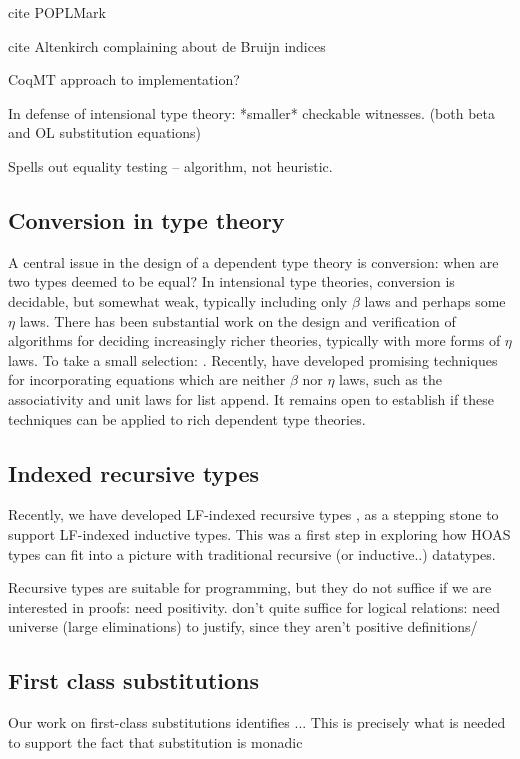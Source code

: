 \documentclass{article}
\newcommand{\LONGVERSION}[1]{{\color{light-gray}#1}}
\begin{document}
cite POPLMark \cite{POPLMark}

cite Altenkirch complaining about de Bruijn indices

CoqMT approach to implementation?

In defense of intensional type theory: *smaller* checkable
witnesses. (both beta and OL substitution equations)

Spells out equality testing -- algorithm, not heuristic.

\subsection{Conversion in type theory}
A central issue in the design of a dependent type theory is
conversion: when are two types deemed to be equal? In
intensional type theories, conversion is decidable, but somewhat
weak, typically including only $\beta$ laws and perhaps some $\eta$
laws. There has been substantial work on the design and verification
of algorithms for deciding increasingly richer theories, typically
with more forms of $\eta$ laws. To take a
small selection: \cite{Coquand91,Harper05,Abel11}. Recently,
\cite{Allais13} have developed promising techniques for incorporating equations
which are neither $\beta$ nor $\eta$ laws, such as the associativity
and unit laws for list append. It remains open to establish if 
these techniques can be applied to rich dependent type theories.

\subsection{Indexed recursive types}
Recently, we have developed LF-indexed recursive types
\citep{Cave12}, as a stepping stone to support LF-indexed inductive
types. This was a first step in exploring how HOAS types can fit
into a picture with traditional recursive (or inductive..) datatypes. 

Recursive types are suitable for programming, but they do not suffice
if we are interested in proofs: need positivity. don't quite suffice
for logical relations: need universe (large eliminations) to justify,
since they aren't positive definitions/
\subsection{First class substitutions}
Our work on first-class substitutions \citep{Cave13} identifies ...
\LONGVERSION{This is precisely what is needed to support the fact that substitution
is monadic \cite{?}}
\end{document}

